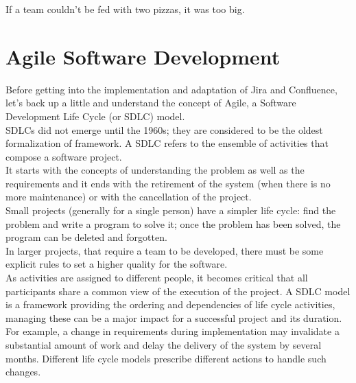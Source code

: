 \begin{savequote}[75mm]
If a team couldn’t be fed with two pizzas, it was too big.
\end{savequote}


\chapter{Agile Software Development}
\label{chapter_3}

Before getting into the implementation and adaptation of Jira and Confluence, let's back up a little and understand the concept of Agile, a Software Development Life Cycle (or SDLC) model.\\
SDLCs did not emerge until the 1960s; they are considered to be the oldest formalization of framework.
A SDLC refers to the ensemble of activities that compose a software project.\\
It starts with the concepts of understanding the problem as well as the requirements and it ends with the retirement of the system (when there is no more maintenance) or with the cancellation of the project.\\
Small projects (generally for a single person) have a simpler life cycle: find the problem and write a program to solve it; once the problem has been solved, the program can be deleted and forgotten.\\
In larger projects, that require a team to be developed, there must be some explicit rules to set a higher quality for the software.\\
As activities are assigned to different people, it becomes critical that all participants share a common view of the execution of the project.
A SDLC model is a framework providing the ordering and dependencies of life cycle activities, managing these can be a major impact for a successful project and its duration.\\
For example, a change in requirements during implementation may invalidate a substantial amount of work and delay the delivery of the system by several months.
Different life cycle models prescribe different actions to handle such changes\cite{software_lyfe_cycle}.\\
